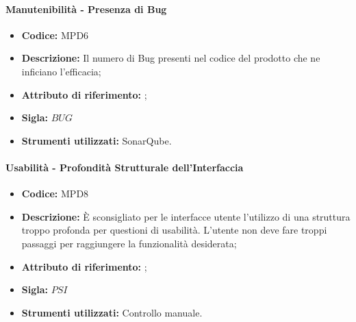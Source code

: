 \paragraph{Manutenibilità - Presenza di Bug} 
\begin{itemize}
    \item \textbf{Codice:} MPD6
    \item \textbf{Descrizione:} Il numero di Bug presenti nel codice del prodotto che ne inficiano l'efficacia;
    \item \textbf{Attributo di riferimento:} ;
    \item \textbf{Sigla:} $BUG$
    \item \textbf{Strumenti utilizzati:} SonarQube.
\end{itemize}

\paragraph{Usabilità - Profondità Strutturale dell'Interfaccia}
\begin{itemize}
    \item \textbf{Codice:} MPD8
    \item \textbf{Descrizione:} È sconsigliato per le interfacce utente l'utilizzo di una struttura troppo profonda per questioni di usabilità. L'utente non deve fare troppi passaggi per raggiungere la funzionalità desiderata;
    \item \textbf{Attributo di riferimento:} ;
    \item \textbf{Sigla:} $PSI$
    \item \textbf{Strumenti utilizzati:} Controllo manuale.
\end{itemize}
